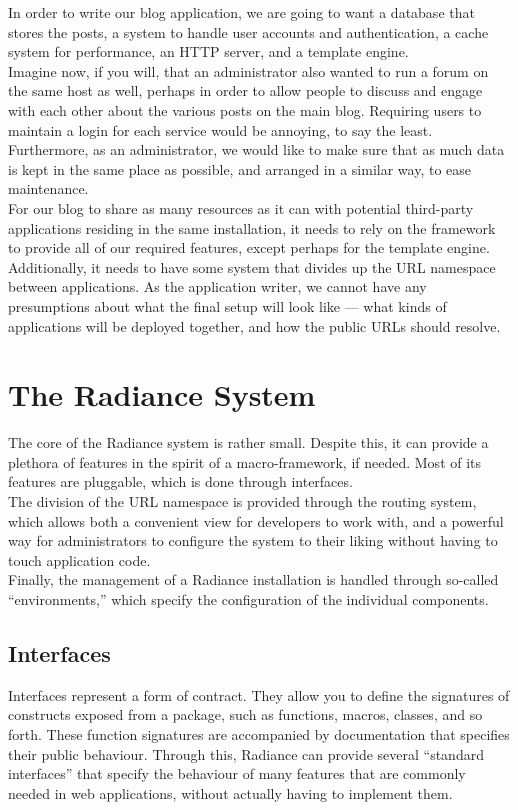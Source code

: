 \documentclass{sig-alternate}
\begin{document}
In order to write our blog application, we are going to want a database that stores the posts, a system to handle user accounts and authentication, a cache system for performance, an HTTP server, and a template engine. \\

Imagine now, if you will, that an administrator also wanted to run a forum on the same host as well, perhaps in order to allow people to discuss and engage with each other about the various posts on the main blog. Requiring users to maintain a login for each service would be annoying, to say the least. Furthermore, as an administrator, we would like to make sure that as much data is kept in the same place as possible, and arranged in a similar way, to ease maintenance. \\

For our blog to share as many resources as it can with potential third-party applications residing in the same installation, it needs to rely on the framework to provide all of our required features, except perhaps for the template engine. Additionally, it needs to have some system that divides up the URL namespace between applications. As the application writer, we cannot have any presumptions about what the final setup will look like --- what kinds of applications will be deployed together, and how the public URLs should resolve. \\

\section{The Radiance System}
The core of the Radiance system is rather small. Despite this, it can provide a plethora of features in the spirit of a macro-framework, if needed. Most of its features are pluggable, which is done through interfaces. \\

The division of the URL namespace is provided through the routing system, which allows both a convenient view for developers to work with, and a powerful way for administrators to configure the system to their liking without having to touch application code. \\

Finally, the management of a Radiance installation is handled through so-called ``environments,'' which specify the configuration of the individual components.

\subsection{Interfaces}
Interfaces represent a form of contract. They allow you to define the signatures of constructs exposed from a package, such as functions, macros, classes, and so forth. These function signatures are accompanied by documentation that specifies their public behaviour. Through this, Radiance can provide several ``standard interfaces'' that specify the behaviour of many features that are commonly needed in web applications, without actually having to implement them. \\
\end{document}

